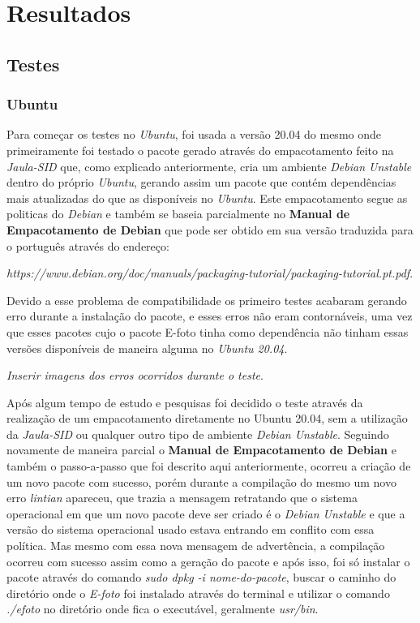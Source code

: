 \chapter{Resultados}

\section{Testes}

\subsection{Ubuntu}
Para começar os testes no \textit{Ubuntu}, foi usada a versão 20.04 do mesmo onde primeiramente foi testado o pacote gerado através do empacotamento feito na \textit{Jaula-SID} que, como explicado anteriormente, cria um ambiente \textit{Debian Unstable} dentro do próprio \textit{Ubuntu}, gerando assim um pacote que contém dependências mais atualizadas do que as disponíveis no \textit{Ubuntu}. Este empacotamento segue as politicas do \textit{Debian} e também se baseia parcialmente no \textbf{Manual de Empacotamento de Debian} que pode ser obtido em sua versão traduzida para o português através do endereço:

\textit{https://www.debian.org/doc/manuals/packaging-tutorial/packaging-tutorial.pt.pdf}.
 
Devido a esse problema de compatibilidade os primeiro testes acabaram gerando erro durante a instalação do pacote, e esses erros não eram contornáveis, uma vez que esses pacotes cujo o pacote E-foto tinha como dependência não tinham essas versões disponíveis de maneira alguma no \textit{Ubuntu 20.04}. 

\textit{Inserir imagens dos erros ocorridos durante o teste}.

Após algum tempo de estudo e pesquisas foi decidido o teste através da realização de um empacotamento diretamente no Ubuntu 20.04, sem a utilização da \textit{Jaula-SID} ou qualquer outro tipo de ambiente \textit{Debian Unstable}. Seguindo novamente de maneira parcial o \textbf{Manual de Empacotamento de Debian} e também o passo-a-passo que foi descrito aqui anteriormente, ocorreu a criação de um novo pacote com sucesso, porém durante a compilação do mesmo um novo erro \textit{lintian} apareceu, que trazia a mensagem retratando que o sistema operacional em que um novo pacote deve ser criado é o \textit{Debian Unstable} e que a versão do sistema operacional usado estava entrando em conflito com essa política. Mas mesmo com essa nova mensagem de advertência, a compilação ocorreu com sucesso assim como a geração do pacote e após isso, foi só instalar o pacote através do comando \textit{sudo dpkg -i nome-do-pacote}, buscar o caminho do diretório onde o \textit{E-foto} foi instalado através do terminal e utilizar o comando \textit{./efoto} no diretório onde fica o executável, geralmente \textit{usr/bin}.

